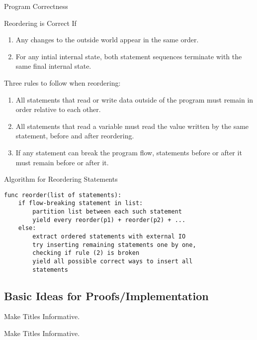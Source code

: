 \begin{frame}{Program Correctness}
\begin{block}{Reordering is Correct If}
\begin{enumerate}
\item Any changes to the outside world appear in the same order.
\item For any intial internal state, both statement sequences terminate with the same final internal state.
\end{enumerate}
\end{block}

\pause

Three rules to follow when reordering:
\begin{enumerate}
\item All statements that read or write data outside of the program must remain in order relative to each other.
\item All statements that read a variable must read the value written by the same statement, before and after reordering.
\item If any statement can break the program flow, statements before or after it must remain before or after it.
\end{enumerate}
\end{frame}

\begin{frame}[fragile]{Algorithm for Reordering Statements}

\small\begin{verbatim}
func reorder(list of statements):
    if flow-breaking statement in list:
        partition list between each such statement
        yield every reorder(p1) + reorder(p2) + ...
    else:
        extract ordered statements with external IO
        try inserting remaining statements one by one,
        checking if rule (2) is broken
        yield all possible correct ways to insert all
        statements
\end{verbatim}
\end{frame}

\subsection{Basic Ideas for Proofs/Implementation}

\begin{frame}{Make Titles Informative.}
\end{frame}

\begin{frame}{Make Titles Informative.}
\end{frame}

